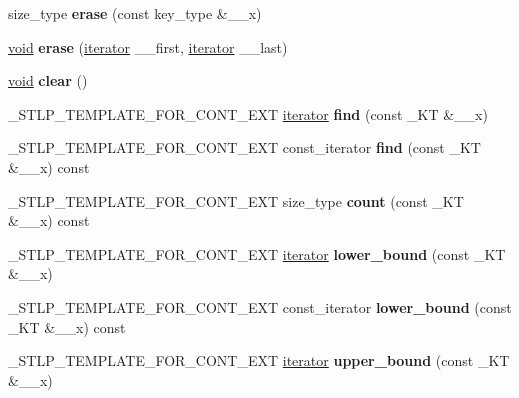 \begin{DoxyCompactItemize}
size\+\_\+type {\bfseries erase} (const key\+\_\+type \&\+\_\+\+\_\+x)
\item 
\mbox{\label{classmultiset_a1abc6699a02201bf43de23d41db0a291}} 
\hyperlink{interfacevoid}{void} {\bfseries erase} (\hyperlink{structiterator}{iterator} \+\_\+\+\_\+first, \hyperlink{structiterator}{iterator} \+\_\+\+\_\+last)
\item 
\mbox{\label{classmultiset_acb2c89744be080829d1e07221efb6137}} 
\hyperlink{interfacevoid}{void} {\bfseries clear} ()
\item 
\mbox{\label{classmultiset_a73d13b5089450963952e1822921645a6}} 
\+\_\+\+S\+T\+L\+P\+\_\+\+T\+E\+M\+P\+L\+A\+T\+E\+\_\+\+F\+O\+R\+\_\+\+C\+O\+N\+T\+\_\+\+E\+XT \hyperlink{structiterator}{iterator} {\bfseries find} (const \+\_\+\+KT \&\+\_\+\+\_\+x)
\item 
\mbox{\label{classmultiset_a9805049aedc2f7ee3ff6812fc78cc8e4}} 
\+\_\+\+S\+T\+L\+P\+\_\+\+T\+E\+M\+P\+L\+A\+T\+E\+\_\+\+F\+O\+R\+\_\+\+C\+O\+N\+T\+\_\+\+E\+XT const\+\_\+iterator {\bfseries find} (const \+\_\+\+KT \&\+\_\+\+\_\+x) const
\item 
\mbox{\label{classmultiset_a22eceb508c5b95f12b2bf2cb3c8afea2}} 
\+\_\+\+S\+T\+L\+P\+\_\+\+T\+E\+M\+P\+L\+A\+T\+E\+\_\+\+F\+O\+R\+\_\+\+C\+O\+N\+T\+\_\+\+E\+XT size\+\_\+type {\bfseries count} (const \+\_\+\+KT \&\+\_\+\+\_\+x) const
\item 
\mbox{\label{classmultiset_a53ede63ac7dce6590b046778e6ebf393}} 
\+\_\+\+S\+T\+L\+P\+\_\+\+T\+E\+M\+P\+L\+A\+T\+E\+\_\+\+F\+O\+R\+\_\+\+C\+O\+N\+T\+\_\+\+E\+XT \hyperlink{structiterator}{iterator} {\bfseries lower\+\_\+bound} (const \+\_\+\+KT \&\+\_\+\+\_\+x)
\item 
\mbox{\label{classmultiset_ad153c50811b1b9312facd4eaa89b58c1}} 
\+\_\+\+S\+T\+L\+P\+\_\+\+T\+E\+M\+P\+L\+A\+T\+E\+\_\+\+F\+O\+R\+\_\+\+C\+O\+N\+T\+\_\+\+E\+XT const\+\_\+iterator {\bfseries lower\+\_\+bound} (const \+\_\+\+KT \&\+\_\+\+\_\+x) const
\item 
\mbox{\label{classmultiset_a63cb61cbba12577efada5ae0d5853ffc}} 
\+\_\+\+S\+T\+L\+P\+\_\+\+T\+E\+M\+P\+L\+A\+T\+E\+\_\+\+F\+O\+R\+\_\+\+C\+O\+N\+T\+\_\+\+E\+XT \hyperlink{structiterator}{iterator} {\bfseries upper\+\_\+bound} (const \+\_\+\+KT \&\+\_\+\+\_\+x)

\end{DoxyCompactItemize}

